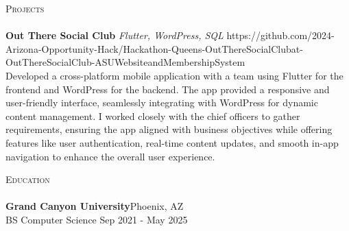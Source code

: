 \documentclass[a4paper]{article}
\newcommand{\lineunder} {
    \vspace*{-8pt} \\
    \hspace*{-18pt} \hrulefill \\
}
\newcommand{\header} [1] {
    {\hspace*{-18pt}\vspace*{6pt} \textsc{#1}}
    \vspace*{-6pt} \lineunder
}
\begin{document}

 

\header{Projects}
{\textbf{Out There Social Club}} {\sl Flutter, WordPress, SQL} \hfill https://github.com/2024-Arizona-Opportunity-Hack/Hackathon-Queens-OutThereSocialClubat-OutThereSocialClub-ASUWebsiteandMembershipSystem\\
Developed a cross-platform mobile application with a team using Flutter for the frontend and WordPress for the backend. The app provided a responsive and user-friendly interface, seamlessly integrating with WordPress for dynamic content management. I worked closely with the chief officers to gather requirements, ensuring the app aligned with business objectives while offering features like user authentication, real-time content updates, and smooth in-app navigation to enhance the overall user experience.\\
\vspace*{2mm}

\header{Education}
\textbf{Grand Canyon University}\hfill Phoenix, AZ\\
BS Computer Science \hfill Sep 2021 - May 2025\\
\vspace{2mm}


\ 
\end{document}
